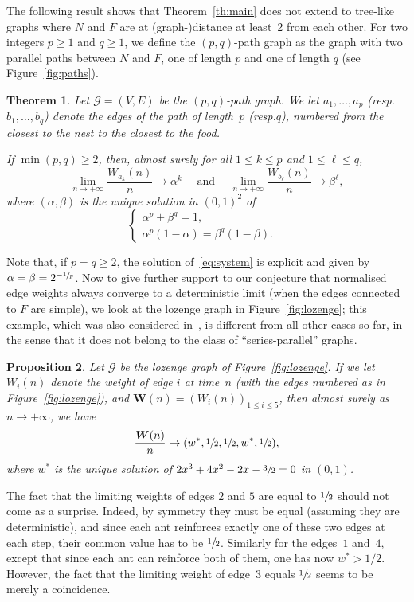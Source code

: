 \documentclass[11pt]{article}
\newcommand{\resp}{resp.\xspace}
\let\mathcal\mathscr
\let \nicefrac\sfrac
\newcommand{\bW}{\boldsymbol{W}}
\numberwithin{equation}{section}
\newtheorem{theorem}{Theorem}[section]
\newtheorem{proposition}[theorem]{Proposition}
\theoremstyle{definition}
\begin{document}
The following result shows that Theorem~\ref{th:main} does not extend to tree-like graphs where $N$ and $F$ are at (graph-)distance at least~2 from each other. For two integers $p\geq 1$ and $q\geq 1$, we define the $(p,q)$-path graph as the graph
with two parallel paths between $N$ and $F$,
one of length $p$ and one of length $q$ (see Figure~\ref{fig:paths}).

\begin{theorem}\label{th:two_paths}
Let $\mathcal G = (V,E)$ be the $(p,q)$-path graph.
We let $a_1, \ldots, a_p$ (\resp $b_1, \ldots, b_q$) denote the edges of the path of length~$p$ (\resp $q$), numbered from the closest to the nest to the closest to the food.

If $\min(p,q)\geq 2$, then, almost surely for all $1\leq k\leq p$ and $1\leq\ell\leq q$,
\[
\lim_{n\to+\infty} \frac{W_{a_k}(n)}n \to \alpha^k
\quad \text{ and }\quad
\lim_{n\to+\infty} \frac{W_{b_\ell}(n)}n \to \beta^\ell,
\]
where $(\alpha, \beta)$ is the unique solution in $(0,1)^2$ of
\begin{equation}\label{eq:system}
\begin{cases}
\alpha^p+\beta^q = 1,&\\
\alpha^p(1-\alpha) =\beta^q(1-\beta).
\end{cases}
\end{equation}
\end{theorem}

Note that, if $p=q\geq 2$, the solution of~\eqref{eq:system}
is explicit and given by $\alpha = \beta = 2^{-\nicefrac1p}$. Now to give further support to our conjecture that normalised edge weights always converge to a deterministic limit (when the edges connected to $F$ are simple), we look at the lozenge graph in Figure~\ref{fig:lozenge}; this example, which was also considered in~\cite{KMS},
is different from all other cases so far, in the sense that it does not belong to the class of ``series-parallel'' graphs.
\begin{proposition}\label{prop:lozenge}
Let $\mathcal G$ be the lozenge graph of Figure~\ref{fig:lozenge}. If we let $W_i(n)$ denote the weight of edge $i$ at time~$n$ (with the edges numbered as in Figure~\ref{fig:lozenge}), and $\bW(n) = (W_i(n))_{1\leq i\leq 5}$, then almost surely as $n\to+\infty$, we have
\[
\frac{\bW(n)}{n} \to (w^*, \nicefrac12, \nicefrac12, w^*, \nicefrac12),
\]
where $w^*$ is the unique solution of $2x^3+4x^2-2x-\nicefrac32 = 0$ in $(0,1)$.
\end{proposition}
{The fact that the limiting weights of edges $2$ and $5$ are equal to $\nicefrac12$ should not come as a surprise. Indeed, by symmetry they must be equal (assuming they are deterministic),
and since each ant reinforces exactly one of these two edges at each step, their common value has to be $\nicefrac12$.
Similarly for the edges~$1$ and~$4$, except that since each ant can reinforce both of them,
one has now $w^*>1/2$.
However, the fact that the limiting weight of edge~$3$ equals $\nicefrac12$ seems to be merely a coincidence.}
\end{document}
